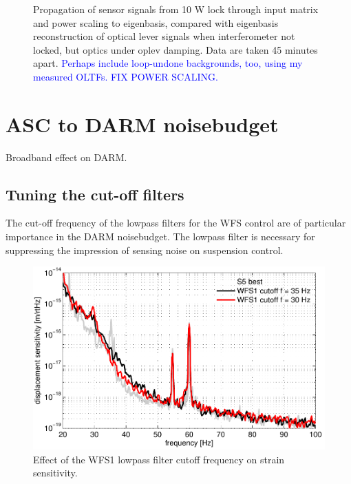 \begin{figure}
\begin{centering}
\caption{Propagation of sensor signals from 10 W lock through
  input matrix and power scaling to eigenbasis, compared with
  eigenbasis reconstruction of optical lever signals when
  interferometer not locked, but optics under oplev damping. Data are
  taken 45 minutes apart. \textcolor{blue}{Perhaps include loop-undone
  backgrounds, too, using my measured OLTFs. FIX POWER SCALING.}}
\label{fig:}
\end{centering}
\end{figure}






\section{ASC to DARM noisebudget}
Broadband effect on DARM.

\subsection{Tuning the cut-off filters} 
The cut-off frequency of the lowpass filters for the WFS control are
of particular importance in the DARM noisebudget. The lowpass filter
is necessary for suppressing the impression of sensing noise on
suspension control. 

\begin{figure}
\begin{centering}
\includegraphics[width=1.0\textwidth]{figures/cutoffWFS1_DARMcompare.pdf}
\caption{Effect of the WFS1 lowpass filter cutoff frequency on strain sensitivity.}
\label{fig:WFS1cutoff}
\end{centering}
\end{figure}




